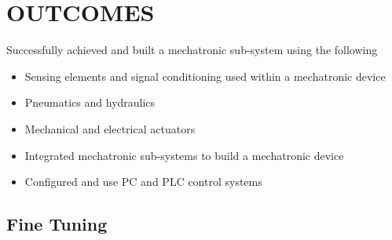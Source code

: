 \documentclass[a4paper, 10pt]{IEEEconf}
\begin{document}



\section{OUTCOMES}

Successfully achieved and built a mechatronic sub-system using the following

\begin{itemize}
	\item Sensing elements and signal conditioning used within a mechatronic device
	\item Pneumatics and hydraulics
	\item Mechanical and electrical actuators
	\item Integrated mechatronic sub-systems to build a mechatronic device
	\item Configured and use PC and PLC control systems
\end{itemize}


\subsection{Fine Tuning} 


\end{document}
